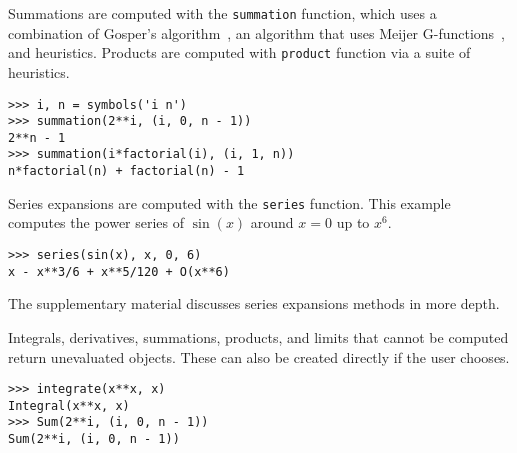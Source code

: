 Summations are computed with the \verb|summation| function, which uses a
combination of Gosper's algorithm~\cite{gosper1978decision}, an algorithm that
uses Meijer G-functions~\cite{Roach1996hyper,roach1997meijerg}, and
heuristics. Products are computed with \verb|product| function via a suite of
heuristics.
\begin{verbatim}
>>> i, n = symbols('i n')
>>> summation(2**i, (i, 0, n - 1))
2**n - 1
>>> summation(i*factorial(i), (i, 1, n))
n*factorial(n) + factorial(n) - 1
\end{verbatim}

Series expansions are computed with the \verb|series| function. This example computes the power series of $\sin(x)$ around $x=0$ up to $x^6$.
\begin{verbatim}
>>> series(sin(x), x, 0, 6)
x - x**3/6 + x**5/120 + O(x**6)
\end{verbatim}
The supplementary material discusses series expansions methods in more depth.

Integrals, derivatives, summations, products, and limits that cannot be
computed return unevaluated objects. These can also be created directly if the
user chooses.
\begin{verbatim}
>>> integrate(x**x, x)
Integral(x**x, x)
>>> Sum(2**i, (i, 0, n - 1))
Sum(2**i, (i, 0, n - 1))
\end{verbatim}
